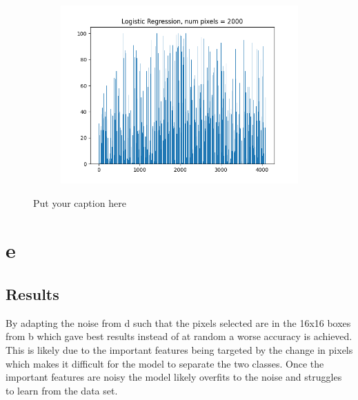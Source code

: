 \documentclass{article}
\begin{document}
\begin{figure}[H]
\begin{subfigure}{.33\textwidth}
  \label{fig:sub-second}
\end{subfigure}
\begin{subfigure}{.33\textwidth}
  \centering
  \includegraphics[width=1\linewidth]{2d/Logistic Regression, 2000.png}  
  
  \label{fig:sub-second}
\end{subfigure}
\caption{Put your caption here}
\label{feet histo 2d}
\end{figure}
\newpage
\section{e}
\subsection{Results}
By adapting the noise from d such that the pixels selected are in the 16x16 boxes from b which gave best results instead of at random a worse accuracy is achieved. This is likely due to the important features being targeted by the change in pixels which makes it difficult for the model to separate the two classes. Once the important features are noisy the model likely overfits to the noise and struggles to learn from the data set.  
\end{document}

